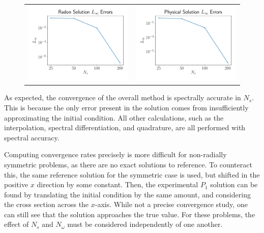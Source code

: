 \begin{center}
    \begin{figure}[H]
        \begin{tabular}{cc}                    
            \includegraphics[height=0.35\linewidth]{figures/Convergence_Radon_Errors.pdf} &
            \includegraphics[height=0.35\linewidth]{figures/Convergence_Physical_Errors.pdf}
        \end{tabular}
    \end{figure}
\end{center}
As expected, the convergence of the overall method is spectrally accurate in $N_s$.
This is because the only error present in the solution comes from insufficiently approximating the initial condition.
All other calculations, such as the interpolation, spectral differentiation, and quadrature, are all performed with spectral accuracy.

Computing convergence rates precisely is more difficult for non-radially symmetric problems, as there are no exact solutions to reference.
To counteract this, the same reference solution for the symmetric case is used, but shifted in the positive $x$ direction by some constant.
Then, the experimental $P_1$ solution can be found by translating the initial condition by the same amount, and considering the cross section across the $x$-axis.
While not a precise convergence study, one can still see that the solution approaches the true value.
For these problems, the effect of $N_s$ and $N_\omega$ must be considered independently of one another.

